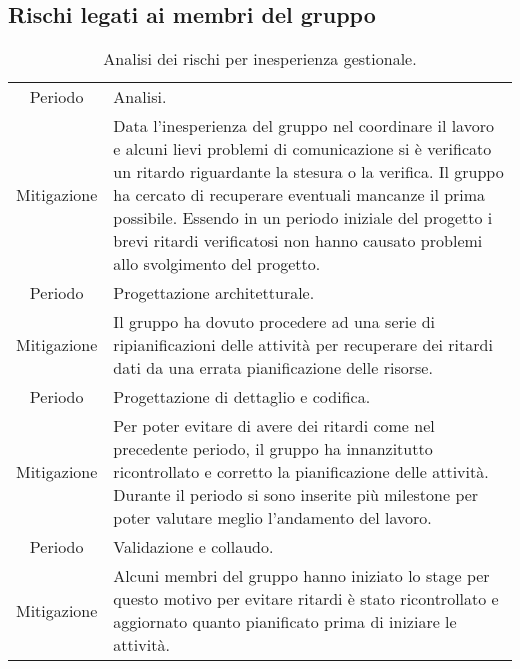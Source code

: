 \subsection{Rischi legati ai membri del gruppo}
\begin{table}[H]
	\centering
    \begin{tabular}{|c|p{11.5cm}|}
    \rowcolor{darkblue} \hline
    \multicolumn{2}{|c|}{\textcolor{white}{\textbf{RG1 - Inesperienza gestionale}}}\\ \hline
    Periodo & Analisi.\\ \hline
    Mitigazione & Data l'inesperienza del gruppo nel coordinare il lavoro e alcuni lievi problemi di comunicazione si è verificato un ritardo riguardante la stesura o la verifica. Il gruppo ha cercato di recuperare eventuali mancanze il prima possibile. Essendo in un periodo iniziale del progetto i brevi ritardi verificatosi non hanno causato problemi allo svolgimento del progetto.\\ \hline
    Periodo & Progettazione architetturale.\\ \hline
    Mitigazione & Il gruppo ha dovuto procedere ad una serie di ripianificazioni delle attività per recuperare dei ritardi dati da una errata pianificazione delle risorse.\\ \hline
    Periodo & Progettazione di dettaglio e codifica.\\ \hline
    Mitigazione & Per poter evitare di avere dei ritardi come nel precedente periodo, il gruppo ha innanzitutto ricontrollato e corretto la pianificazione delle attività. Durante il periodo si sono inserite più milestone per poter valutare meglio l'andamento del lavoro.\\ \hline
    Periodo & Validazione e collaudo.\\ \hline
    Mitigazione & Alcuni membri del gruppo hanno iniziato lo stage per questo motivo per evitare ritardi è stato ricontrollato e aggiornato quanto pianificato prima di iniziare le attività.\\ \hline
    \end{tabular}
    \caption{\label{tab:ARG3}Analisi dei rischi per inesperienza gestionale.}
\end{table}
